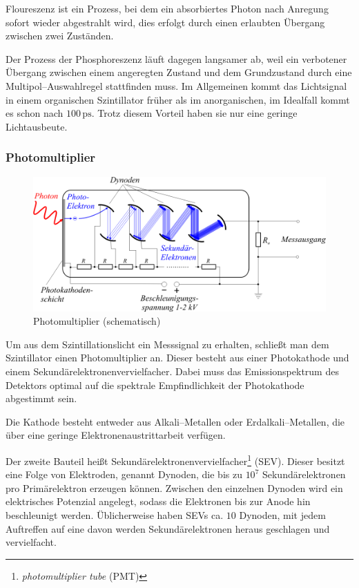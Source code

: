 \documentclass[12pt,a4paper]{scrartcl}
\numberwithin{equation}{section} %
\newcommand{\pu}[1]{\ensuremath{\mathrm{#1}}}
\begin{document}
Floureszenz ist ein Prozess, bei dem ein absorbiertes Photon nach Anregung sofort wieder abgestrahlt wird, dies erfolgt durch einen erlaubten Übergang zwischen zwei Zuständen. \cite{LMU}

Der Prozess der Phosphoreszenz läuft dagegen langsamer ab, weil ein verbotener Übergang zwischen einem angeregten Zustand und dem Grundzustand durch eine Multipol--Auswahlregel stattfinden muss. Im Allgemeinen kommt das Lichtsignal in einem organischen Szintillator früher als im anorganischen, im Idealfall kommt es schon nach $\pu{100\, ps}$. Trotz diesem Vorteil haben sie nur eine geringe Lichtausbeute. \cite{LMU}

\hypertarget{photomultiplier}{%
\subsubsection{Photomultiplier}\label{photomultiplier}}

\begin{figure}[h]
	\centering
	\includegraphics{../media/B3.4/Photomultiplier_schema_de.png}
	\caption{Photomultiplier (schematisch) \cite{abb:Photomultiplier}}
	\label{abb:Photomultiplier}
\end{figure}

\noindent
Um aus dem Szintillationslicht ein Messsignal zu erhalten, schließt man dem Szintillator einen Photomultiplier an. Dieser besteht aus einer Photokathode und einem Sekundärelektronenvervielfacher. Dabei muss das Emissionspektrum des Detektors optimal auf die spektrale Empfindlichkeit der Photokathode abgestimmt sein.

Die Kathode besteht entweder aus Alkali--Metallen oder Erdalkali--Metallen, die über eine geringe Elektronenaustrittarbeit verfügen.

Der zweite Bauteil heißt Sekundärelektronenvervielfacher\footnote{\emph{photomultiplier tube} (PMT)} (SEV). Dieser besitzt eine Folge von Elektroden, genannt Dynoden, die bis zu $10^7$ Sekundärelektronen pro Primärelektron erzeugen können. Zwischen den einzelnen Dynoden wird ein elektrisches Potenzial angelegt, sodass die Elektronen bis zur Anode hin beschleunigt werden. Üblicherweise haben SEVs ca. $10$ Dynoden, mit jedem Auftreffen auf eine davon werden Sekundärelektronen heraus geschlagen und vervielfacht.
\end{document}

